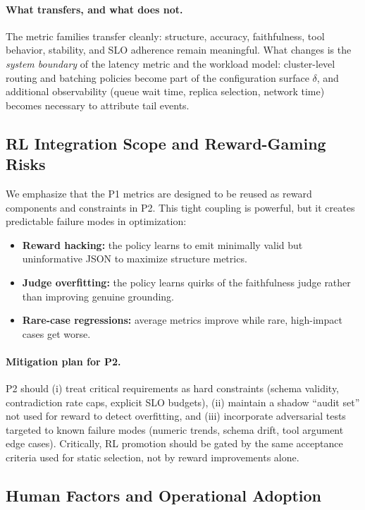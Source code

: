 \documentclass[11pt]{article}
\begin{document}
\paragraph{What transfers, and what does not.}
The metric families transfer cleanly: structure, accuracy, faithfulness, tool behavior, stability, and SLO adherence remain meaningful.
What changes is the \emph{system boundary} of the latency metric and the workload model: cluster-level routing and batching policies become part of the configuration surface $\delta$, and additional observability (queue wait time, replica selection, network time) becomes necessary to attribute tail events.

\subsection{RL Integration Scope and Reward-Gaming Risks}

We emphasize that the P1 metrics are designed to be reused as reward components and constraints in P2.
This tight coupling is powerful, but it creates predictable failure modes in optimization:

\begin{itemize}[leftmargin=12pt]
    \item \textbf{Reward hacking:} the policy learns to emit minimally valid but uninformative JSON to maximize structure metrics.
    \item \textbf{Judge overfitting:} the policy learns quirks of the faithfulness judge rather than improving genuine grounding.
    \item \textbf{Rare-case regressions:} average metrics improve while rare, high-impact cases get worse.
\end{itemize}

\paragraph{Mitigation plan for P2.}
P2 should (i) treat critical requirements as hard constraints (schema validity, contradiction rate caps, explicit SLO budgets), (ii) maintain a shadow ``audit set'' not used for reward to detect overfitting, and (iii) incorporate adversarial tests targeted to known failure modes (numeric trends, schema drift, tool argument edge cases).
Critically, RL promotion should be gated by the same acceptance criteria used for static selection, not by reward improvements alone.

\subsection{Human Factors and Operational Adoption}
\end{document}
